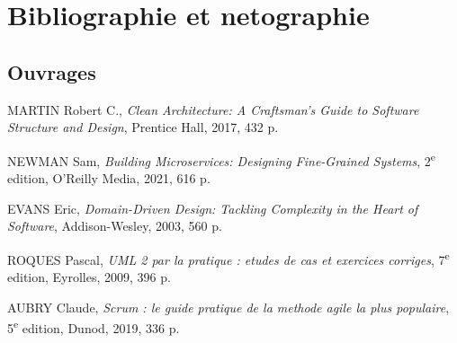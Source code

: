 \cleardoublepage
{}
{}
\chapter*{Bibliographie et netographie}

\sloppy
\setlength{\emergencystretch}{4em}
\makeatletter
\g@addto@macro\UrlBreaks{\do\-\do\.\do\=\do\?\do\&\do\_}
\makeatother

\section*{Ouvrages}

\begin{enumerate}[label={[\arabic*]},leftmargin=*,itemsep=4pt]

\item MARTIN Robert C., \textit{Clean Architecture: A Craftsman's Guide
  to Software Structure and Design}, Prentice Hall, 2017, 432 p.

\item NEWMAN Sam, \textit{Building Microservices: Designing Fine-Grained
  Systems}, 2\textsuperscript{e} edition, O'Reilly Media, 2021, 616 p.

\item EVANS Eric, \textit{Domain-Driven Design: Tackling Complexity in
  the Heart of Software}, Addison-Wesley, 2003, 560 p.

\item ROQUES Pascal, \textit{UML 2 par la pratique : etudes de cas et
  exercices corriges}, 7\textsuperscript{e} edition, Eyrolles, 2009,
  396 p.

\item AUBRY Claude, \textit{Scrum : le guide pratique de la methode agile
  la plus populaire}, 5\textsuperscript{e} edition, Dunod, 2019, 336 p.

\end{enumerate}

